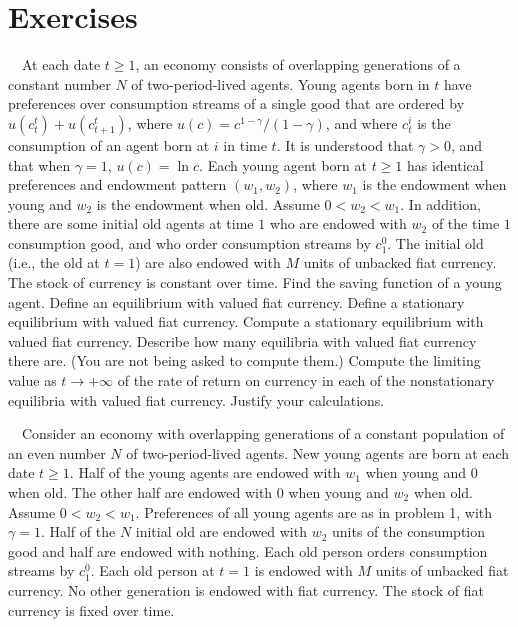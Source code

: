 \section{Exercises}
\showchaptIDtrue
\showsectIDtrue
{} \ \  At each date $t \geq 1$, an  economy
consists of  overlapping generations of  a constant
number $N$ of two-period-lived agents.  Young
agents born in $t$ have preferences over consumption streams of
a single good that are ordered by
$ u(c_t^t) + u(c^t_{t+1}) $, where
$u(c) = c^{1 - \gamma} / (1-\gamma)$, and where $c^i_t$ is the
consumption of an agent born at $i$ in time $t$. It is understood
that $\gamma >0$, and that when $\gamma = 1$, $u(c) = \ln c$.   Each
young agent born at $t \geq 1$ has identical preferences and endowment
pattern
$(w_1,w_2)$, where $w_1$  is the endowment when young and  $w_2$
 is the endowment when old.
Assume $0 < w_2 < w_1$.
 In addition,
there are some initial old agents at time $1$ who
are endowed with $w_2$ of the time $1$ consumption good, and
who order consumption streams by $c^0_1$.   The initial old
(i.e., the old  at $t=1$)
are also endowed with $M$ units of unbacked fiat currency.  The
stock of currency is constant over time.
\medskip
{}    Find the saving function of a young agent.
\medskip
{}  Define an equilibrium with valued fiat
currency.
\medskip
{}   Define a stationary equilibrium with valued
fiat currency.
\medskip
{}  Compute a stationary equilibrium with valued
fiat currency.
\medskip
{}  Describe how many equilibria with
valued fiat currency there are.  (You are not being asked to
compute them.)
\medskip
{}  Compute the limiting value as $t \rightarrow + \infty$
of the rate of return on currency in each of the nonstationary
equilibria with valued fiat currency.  Justify your calculations.

\bigskip
{} \ \
  Consider an economy with overlapping generations
of a constant population of an even number  $N$ of  two-period-lived agents.
New young agents are born at each date $t\geq 1$.
Half of the young agents are endowed with
$w_1$ when young and $0$ when old.  The other half are
endowed with $0$ when young and  $w_2$ when old.
Assume $0 < w_2 < w_1$.
Preferences of all young agents are as in problem
1, with $\gamma =1$.   Half of the $N$ initial old are endowed
with $w_2$  units of the consumption good and half are endowed
with nothing.  Each old  person orders consumption streams by
$c^0_1$.  Each old person at $t=1$ is endowed with $M$ units
of unbacked fiat currency. No other generation is endowed with
fiat currency.  The stock of fiat currency is fixed over time.

